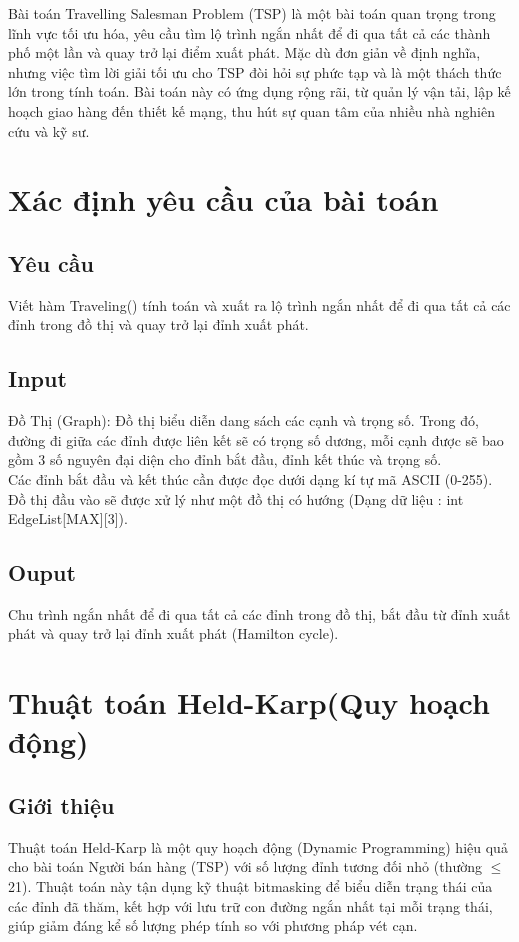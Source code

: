 \documentclass[11pt,a4paper,openany]{report}
\begin{document}
Bài toán Travelling Salesman Problem (TSP) là một bài toán quan trọng trong lĩnh vực tối
ưu hóa, yêu cầu tìm lộ trình ngắn nhất để đi qua tất cả các thành phố một lần và quay trở lại
điểm xuất phát. Mặc dù đơn giản về định nghĩa, nhưng việc tìm lời giải tối ưu cho TSP đòi hỏi
sự phức tạp và là một thách thức lớn trong tính toán. Bài toán này có ứng dụng rộng rãi, từ
quản lý vận tải, lập kế hoạch giao hàng đến thiết kế mạng, thu hút sự quan tâm của nhiều nhà
nghiên cứu và kỹ sư.
\section{Xác định yêu cầu của bài toán }
\subsection{Yêu cầu}
Viết hàm Traveling() tính toán và xuất ra lộ trình ngắn nhất để đi qua tất cả các đỉnh trong đồ thị và
quay trở lại đỉnh xuất phát.
\subsection{Input}
Đồ Thị (Graph): Đồ thị biểu diễn dang sách các cạnh và trọng số. Trong đó, đường đi giữa các
đỉnh được liên kết sẽ có trọng số dương, mỗi cạnh được sẽ bao gồm 3 số nguyên đại diện cho
đỉnh bắt đầu, đỉnh kết thúc và trọng số.\\
Các đỉnh bắt đầu và kết thúc cần được đọc dưới dạng kí tự mã ASCII (0-255).\\
Đồ thị đầu vào sẽ được xử lý như một đồ thị có hướng (Dạng dữ liệu : int EdgeList[MAX][3]).
\subsection{Ouput}
Chu trình ngắn nhất để đi qua tất cả các đỉnh trong đồ thị, bắt đầu từ đỉnh xuất phát và quay trở lại đỉnh xuất phát (Hamilton cycle).
\section{Thuật toán Held-Karp(Quy hoạch động)}
\subsection{Giới thiệu}
Thuật toán Held-Karp là một quy hoạch động (Dynamic Programming) hiệu quả cho bài toán Người bán hàng (TSP) với số lượng đỉnh tương đối nhỏ (thường $\le$ 21).  
Thuật toán này tận dụng kỹ thuật bitmasking để biểu diễn trạng thái của các đỉnh đã thăm, kết hợp với lưu trữ con đường ngắn nhất tại mỗi trạng thái, 
giúp giảm đáng kể số lượng phép tính so với phương pháp vét cạn.
\end{document}

